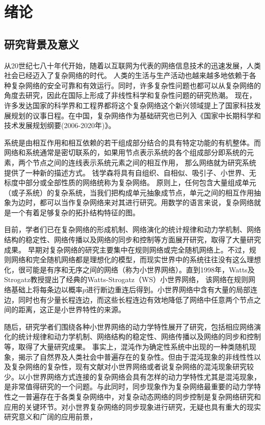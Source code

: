 \chapter{绪论}
\section{研究背景及意义}
从20世纪七八十年代开始，随着以互联网为代表的网络信息技术的迅速发展，人类社会已经迈入了复杂网络的时代。
人类的生活与生产活动也越来越多地依赖于各种复杂网络的安全可靠和有效运行。同时，许多复杂性问题也都可以从复杂网络的角度去研究，因此在国际上形成了非线性科学和复杂性问题的研究热潮。
现在，许多发达国家的科学界和工程界都将这个复杂网络这个新兴领域提上了国家科技发展规划的议事日程。在中国，复杂网络作为基础研究也已列入《国家中长期科学和技术发展规划纲要(2006-2020年)》。

系统是由相互作用和相互依赖的若干组成部分结合的具有特定功能的有机整体。而网络和系统通常是密切联系的，如果用节点表示系统的各个组成部分即系统的元素，两个节点之间的连线表示系统元素之间的相互作用，
那么网络就为研究系统提供了一种新的描述方式。
钱学森将具有自组织、自相似、吸引子、小世界、无标度中部分或全部性质的网络统称为复杂网络。
原则上，任何包含大量组成单元（或子系统）的复杂系统，当我们把构成单元抽象成节点，单元之间的相互作用抽象为边时，都可以当作复杂网络来对其进行研究。用数学的语言来说，复杂网络就是一个有着足够复杂的拓扑结构特征的图。

目前，学者们已在复杂网络的形成机制、网络演化的统计规律和动力学机制、网络结构的稳定性、网络传播以及网络的同步和控制等方面展开研究，取得了大量研究成果。
早期对复杂网络的研究主要集中在规则网络或完全随机网络上。不过，规则网络和完全随机网络都是理想化的模型，而现实世界中的系统往往没有这么理想化，很可能是有序和无序之间的网络（称为小世界网络）。直到1998年，Watts及Strogatz教授提出了经典的Watts-Strogatz（WS）小世界网络，
该网络在规则网络基础上将每条边以概率$p$进行断边重连后得到。小世界网络中含有大量的局部连边，同时也有少量长程连边，而这些长程连边有效地降低了网络中任意两个节点之间的距离，这正是小世界特性的来源。

随后，研究学者们围绕各种小世界网络的动力学特性展开了研究，包括相应网络演化的统计规律和动力学机制、网络结构的稳定性、网络传播以及网络的同步和控制等，取得了大量研究成果。
事实上，混沌作为确定性系统中出现的一种类随机现象，揭示了自然界及人类社会中普遍存在的复杂性。但由于混沌现象的非线性性以及复杂网络的复杂性，现有文献对小世界网络或者说复杂网络的混沌现象研究较少。以小世界网络方式连接的复杂网络会具有怎样的动力学特性尤其是混沌现象，
是非常值得研究的一个问题。与此同时，同步现象作为复杂网络最重要的动力学特性之一普遍存在于各类复杂网络中，对复杂动态网络的同步控制是复杂网络研究和应用的关键环节。对小世界复杂网络的同步现象进行研究，无疑也具有重大的现实研究意义和广阔的应用前景，

